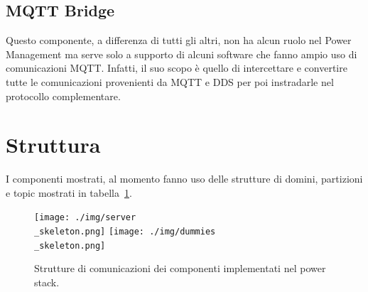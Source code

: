 \subsection*{MQTT Bridge}
Questo componente, a differenza di tutti gli altri, non ha alcun ruolo nel Power Management ma serve solo a supporto di alcuni software che fanno ampio uso di comunicazioni MQTT\cite{mqtt}. Infatti, il suo scopo è quello di intercettare e convertire tutte le comunicazioni provenienti da MQTT e DDS per poi instradarle nel protocollo complementare.%

\section{Struttura}
I componenti mostrati, al momento fanno uso delle strutture di domini, partizioni e topic mostrati in tabella~\ref{fig:dummy_topic}.

\begin{figure}[H]
    \centering
    \texttt{[image: ./img/server\\\_skeleton.png]}
    \texttt{[image: ./img/dummies\\\_skeleton.png]}
    \caption{Strutture di comunicazioni dei componenti implementati nel power stack.}
    \label{fig:dummy_topic}
\end{figure}
